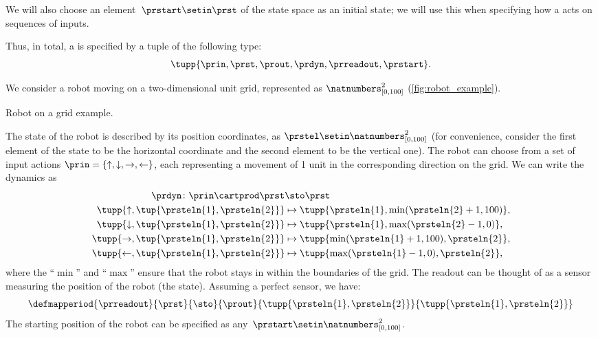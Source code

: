 We will also choose an element~$\prstart \setin \prst$ of the state space as an initial state; we will use this when specifying how a  acts on sequences of inputs.

Thus, in total, a  is specified by a tuple of the following type:
\begin{equation}
    \label{eq:moore-tuple}
    \tupp{\prin,\prst,\prout,\prdyn,\prreadout,\prstart}.
\end{equation}

\begin{example}
    \label{exa:robot_on_a_grid}
    We consider a robot moving on a two-dimensional unit grid, represented as $\natnumbers^2_{[0,100]}$ (\cref{fig:robot_example}).
    \begin{marginfigure}
        \centering
        \caption{Robot on a grid example. }
        \label{fig:robot_example}
    \end{marginfigure}

    The state of the robot is described by its position coordinates, as $\prstel \setin \natnumbers^2_{[0,100]}$ (for convenience, consider the first element of the state to be the horizontal coordinate and the second element to be the vertical one).
    The robot can choose from a set of input actions $\prin=\{\uparrow, \downarrow,\rightarrow,\leftarrow\}$, each representing a movement of 1 unit in the corresponding direction on the grid.
    We can write the dynamics as
    \begin{equation}
        \begin{aligned}
            \prdyn\colon \prin \cartprod \prst                & \sto \prst \\
            \tupp{\uparrow, \tup{\prsteln{1},\prsteln{2}}}    & \mapsto \tupp{\prsteln{1}, \min(\prsteln{2}+1,100)}, \\
            \tupp{\downarrow, \tup{\prsteln{1},\prsteln{2}}}  & \mapsto \tupp{\prsteln{1}, \max(\prsteln{2}-1,0)}, \\
            \tupp{\rightarrow, \tup{\prsteln{1},\prsteln{2}}} & \mapsto \tupp{\min(\prsteln{1}+1,100), \prsteln{2}}, \\
            \tupp{\leftarrow, \tup{\prsteln{1},\prsteln{2}}}  & \mapsto \tupp{\max(\prsteln{1}-1,0), \prsteln{2}}, \\
        \end{aligned}
    \end{equation}
    where the ``$\min$'' and ``$\max$'' ensure that the robot stays in within the boundaries of the grid.
    The readout can be thought of as a sensor measuring the position of the robot (the state).
    Assuming a perfect sensor, we have:
    \begin{equation*}
        \defmapperiod{\prreadout}
        {\prst}
        {\sto}
        {\prout}
        {\tupp{\prsteln{1},\prsteln{2}}}
        {\tupp{\prsteln{1},\prsteln{2}}}
    \end{equation*}
    The starting position of the robot can be specified as any~$\prstart\setin \natnumbers^2_{[0,100]}$.
\end{example}

